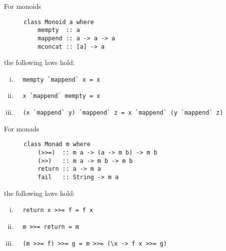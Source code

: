 \documentclass[a4paper,8pt]{article}
\begin{document}
\begin{outline}
    For monoids
    \begin{figure}[thp]
      \centering
      \begin{minipage}{0.4\textwidth}
        \begin{verbatim}
class Monoid a where
    mempty  :: a
    mappend :: a -> a -> a
    mconcat :: [a] -> a
        \end{verbatim}
      \end{minipage}
    \end{figure}

    the following laws hold:
    \begin{enumerate}[i.]
      \item
        \begin{verbatim}
  mempty `mappend` x = x
        \end{verbatim}
      \item
        \begin{verbatim}
  x `mappend` mempty = x
        \end{verbatim}
      \item
        \begin{verbatim}
  (x `mappend` y) `mappend` z = x `mappend` (y `mappend` z)
        \end{verbatim}
    \end{enumerate}

  \pagebreak
    For monads
    \begin{figure}[thp]
      \centering
      \begin{minipage}{0.4\textwidth}
        \begin{verbatim}
class Monad m where
    (>>=)  :: m a -> (a -> m b) -> m b
    (>>)   :: m a -> m b -> m b
    return :: a -> m a
    fail   :: String -> m a
        \end{verbatim}
      \end{minipage}
    \end{figure}

    the following laws hold:
    \begin{enumerate}[i.]
      \item
        \begin{verbatim}
  return x >>= f = f x
        \end{verbatim}
      \item
        \begin{verbatim}
  m >>= return = m
        \end{verbatim}
      \item
        \begin{verbatim}
  (m >>= f) >>= g = m >>= (\x -> f x >>= g)
        \end{verbatim}
    \end{enumerate}

\end{outline}
\end{document}

